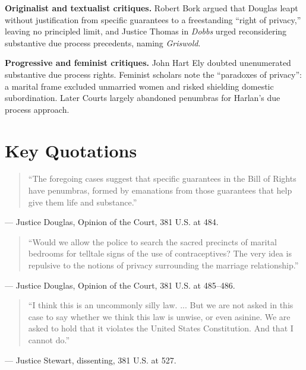 \documentclass[12pt]{article}
\begin{document}
\textbf{Originalist and textualist critiques.} Robert Bork argued that Douglas leapt without justification from specific guarantees to a freestanding ``right of privacy,'' leaving no principled limit, and Justice Thomas in \textit{Dobbs} urged reconsidering substantive due process precedents, naming \textit{Griswold}.

\textbf{Progressive and feminist critiques.} John Hart Ely doubted unenumerated substantive due process rights. Feminist scholars note the ``paradoxes of privacy'': a marital frame excluded unmarried women and risked shielding domestic subordination. Later Courts largely abandoned penumbras for Harlan's due process approach.

\section{Key Quotations}

\begin{quote}
``The foregoing cases suggest that specific guarantees in the Bill of Rights have penumbras, formed by emanations from those guarantees that help give them life and substance.''
\end{quote}
\noindent --- Justice Douglas, Opinion of the Court, 381 U.S. at 484.

\begin{quote}
``Would we allow the police to search the sacred precincts of marital bedrooms for telltale signs of the use of contraceptives? The very idea is repulsive to the notions of privacy surrounding the marriage relationship.''
\end{quote}
\noindent --- Justice Douglas, Opinion of the Court, 381 U.S. at 485--486.

\begin{quote}
``I think this is an uncommonly silly law. ... But we are not asked in this case to say whether we think this law is unwise, or even asinine. We are asked to hold that it violates the United States Constitution. And that I cannot do.''
\end{quote}
\noindent --- Justice Stewart, dissenting, 381 U.S. at 527.
\end{document}
